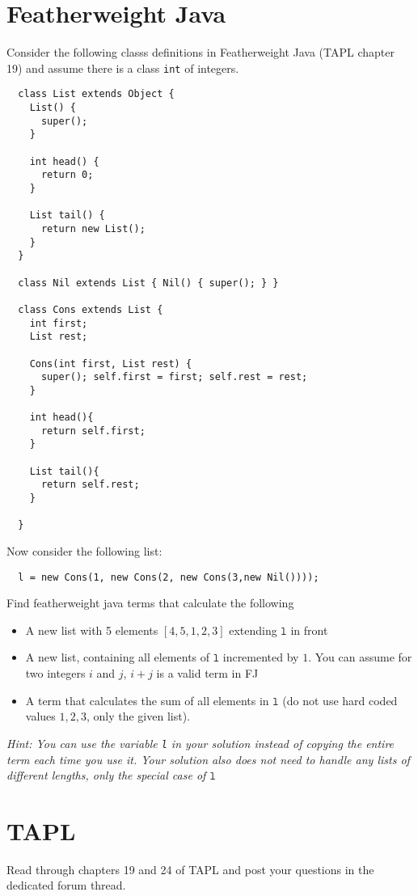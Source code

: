 \section{Featherweight Java}
Consider the following classs definitions in Featherweight Java (TAPL chapter 19) and assume there is a class \texttt{int} of integers.
\begin{lstlisting}
  class List extends Object { 
    List() { 
      super(); 
    } 

    int head() {
      return 0;
    }

    List tail() {
      return new List();
    }
  }

  class Nil extends List { Nil() { super(); } }

  class Cons extends List {
    int first;
    List rest;

    Cons(int first, List rest) {
      super(); self.first = first; self.rest = rest;
    }

    int head(){
      return self.first;
    }

    List tail(){
      return self.rest;
    }

  }
\end{lstlisting}

Now consider the following list:
\begin{lstlisting}
  l = new Cons(1, new Cons(2, new Cons(3,new Nil())));
\end{lstlisting}
Find featherweight java terms that calculate the following
\begin{itemize}
  \item A new list with 5 elements $[4,5,1,2,3]$ extending $\mathtt{l}$ in front
  \item A new list, containing all elements of $\mathtt{l}$ incremented by $1$. You can assume for two integers $i$ and $j$, $i+j$ is a valid term in FJ
  \item A term that calculates the sum of all elements in $\mathtt{l}$ (do not use hard coded values $1,2,3$, only the given list).
\end{itemize}
\emph{Hint: You can use the variable \texttt{l} in your solution instead of copying the entire term each time you use it.
  Your solution also does not need to handle any lists of different lengths, only the special case of $\mathtt{l}$}

%
%

\section{TAPL}
Read through chapters 19 and 24 of TAPL and post your questions in the dedicated forum thread.
